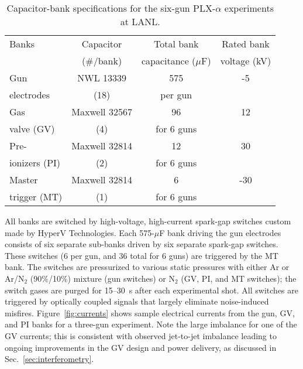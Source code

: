 \documentclass[journal]{IEEEtran}
\begin{document}
\begin{table}[!b]
\renewcommand{\arraystretch}{1.2}
\caption{Capacitor-bank specifications for the six-gun PLX-$\alpha$ experiments at LANL\@.}
\label{table:cap_banks}
\centering
\begin{tabular}{lccc}
\hline\hline
Banks & Capacitor & Total bank  & Rated bank \\
 & (\#/bank) & capacitance ($\mu$F) & voltage (kV) \\
\hline
Gun & NWL 13339 & 575 & -5 \\
electrodes & (18) & per gun & \\
\hline
Gas & Maxwell 32567 & 96 & 12\\
valve (GV)  & (4) & for 6 guns & \\
\hline
Pre- & Maxwell 32814 &12 & 30 \\
ionizers (PI) & (2) & for 6 guns & \\
\hline
Master & Maxwell 32814 & 6 & -30 \\
trigger (MT) & (1) & for 6 guns & \\
\hline\hline
\end{tabular}
\end{table}

All banks are switched by
high-voltage, high-current spark-gap switches custom made by HyperV Technologies.  Each 
575-$\mu$F bank
driving the gun electrodes consists of six separate sub-banks driven by six separate spark-gap
switches.  These
switches (6 per gun, and 36 total for 6 guns) are triggered by the MT bank.  The switches are 
pressurized to various static pressures with either Ar or Ar/N$_2$ (90\%/10\%) mixture
(gun switches) or N$_2$ (GV, PI, and MT 
switches); the switch gases are purged for 15--30~s after each experimental shot.
All switches are triggered by optically coupled signals that largely eliminate noise-induced misfires.
Figure~\ref{fig:currents} shows sample electrical currents from the gun, GV, and PI
banks for a three-gun experiment.  Note the large imbalance for one of the GV currents; this is
consistent with observed jet-to-jet imbalance leading to ongoing improvements
in the GV design and power delivery, as discussed in Sec.~\ref{sec:interferometry}.
\end{document}
